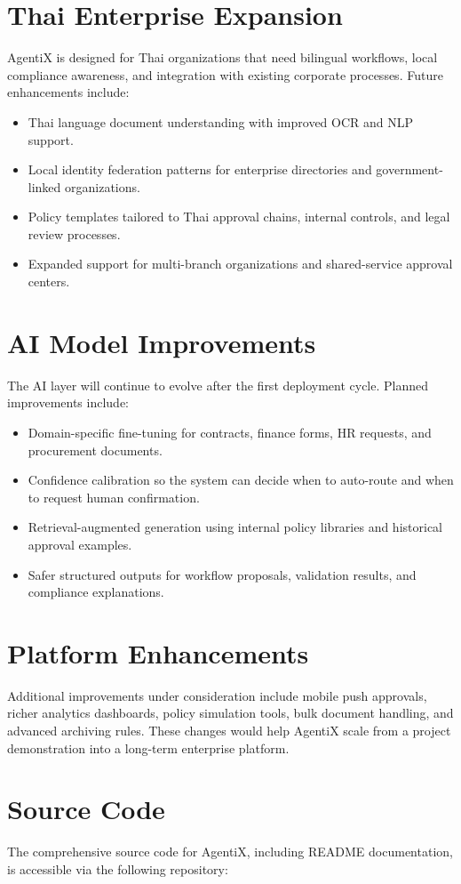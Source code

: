 \documentclass[12pt,oneside,openright,a4paper]{cpe-english-project}
\begin{document}
\section{Thai Enterprise Expansion}

AgentiX is designed for Thai organizations that need bilingual workflows, local compliance awareness, and integration with existing corporate processes. Future enhancements include:

\begin{itemize}
  \item Thai language document understanding with improved OCR and NLP support.
  \item Local identity federation patterns for enterprise directories and government-linked organizations.
  \item Policy templates tailored to Thai approval chains, internal controls, and legal review processes.
  \item Expanded support for multi-branch organizations and shared-service approval centers.
\end{itemize}

\section{AI Model Improvements}

The AI layer will continue to evolve after the first deployment cycle. Planned improvements include:

\begin{itemize}
  \item Domain-specific fine-tuning for contracts, finance forms, HR requests, and procurement documents.
  \item Confidence calibration so the system can decide when to auto-route and when to request human confirmation.
  \item Retrieval-augmented generation using internal policy libraries and historical approval examples.
  \item Safer structured outputs for workflow proposals, validation results, and compliance explanations.
\end{itemize}

\section{Platform Enhancements}

Additional improvements under consideration include mobile push approvals, richer analytics dashboards, policy simulation tools, bulk document handling, and advanced archiving rules. These changes would help AgentiX scale from a project demonstration into a long-term enterprise platform.

\section{Source Code}
The comprehensive source code for AgentiX, including README documentation, is accessible via the following repository:


\nocite{*}

\end{document}
